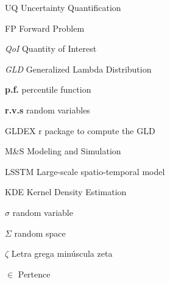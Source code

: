 \documentclass[
	12pt,				%
	openright,			%
	oneside,			%
	a4paper,			%
	sumario=tradicional,%
	brazil,			%
	french,				%
	spanish,			%
	english				%
	]{abntex2}
\theoremstyle{plain}
\theoremstyle{definition}
\begin{document}
%

%

\listoffigures*
\cleardoublepage

\listoftables*
\cleardoublepage

\begin{siglas}
  \item[UQ] Uncertainty Quantification
  \item[FP] Forward Problem
  \item[\textit{QoI}] Quantity of Interest
  \item[\textit{GLD}] Generalized Lambda Distribution
  \item[\textbf{p.f.}] percentile function
  \item[\textbf{r.v.s}] random variables
  \item[GLDEX] r package to compute the GLD 
  \item[M\&S] Modeling and Simulation
  \item[LSSTM] Large-scale spatio-temporal model
  \item[KDE] Kernel Density Estimation
\end{siglas}

\begin{simbolos}
  \item[$ \sigma $] random variable
  \item[$ \Sigma $] random space
  \item[$ \zeta $] Letra grega minúscula zeta
  \item[$ \in $] Pertence
\end{simbolos}
\end{document}

